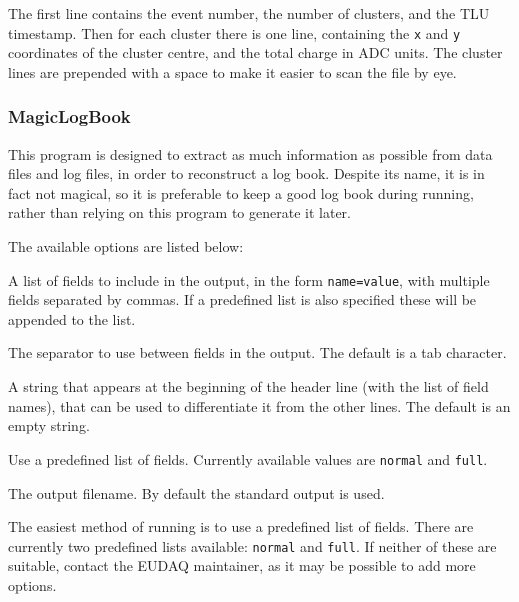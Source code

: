 The first line contains the event number,
the number of clusters, and the TLU timestamp.
Then for each cluster there is one line,
containing the \texttt{x} and \texttt{y} coordinates of the cluster centre,
and the total charge in ADC units.
The cluster lines are prepended with a space to make it easier to scan the file by eye.


\subsubsection{MagicLogBook}
\label{sec:MagicLogBook}
This program is designed to extract as much information as possible from data files and log files,
in order to reconstruct a log book.
Despite its name, it is in fact not magical,
so it is preferable to keep a good log book during running,
rather than relying on this program to generate it later.

The available options are listed below:
\begin{description}
A list of fields to include in the output, in the form \texttt{name=value},
with multiple fields separated by commas.
If a predefined list is also specified these will be appended to the list.

The separator to use between fields in the output. The default is a tab character.

A string that appears at the beginning of the header line (with the list of field names),
that can be used to differentiate it from the other lines. The default is an empty string.

Use a predefined list of fields.
Currently available values are \texttt{normal} and \texttt{full}.

The output filename. By default the standard output is used.

\end{description}

The easiest method of running is to use a predefined list of fields.
There are currently two predefined lists available: \texttt{normal} and \texttt{full}.
If neither of these are suitable, contact the EUDAQ maintainer,
as it may be possible to add more options.

